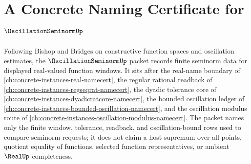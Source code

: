 \chapter{A Concrete Naming Certificate for $\OscillationSeminormUp$}
\label{ch:concrete-instances-oscillation-seminorm-namecert}

Following Bishop and Bridges on constructive function spaces and oscillation estimates, the $\OscillationSeminormUp$ packet records finite seminorm data for displayed real-valued function windows. It sits after the real-name boundary of \autoref{ch:concrete-instances-real-namecert}, the regular rational readback of \autoref{ch:concrete-instances-regseqrat-namecert}, the dyadic tolerance core of \autoref{ch:concrete-instances-dyadicratcore-namecert}, the bounded oscillation ledger of \autoref{ch:concrete-instances-bounded-oscillation-namecert}, and the oscillation modulus route of \autoref{ch:concrete-instances-oscillation-modulus-namecert}. The packet names only the finite window, tolerance, readback, and oscillation-bound rows used to compare seminorm requests; it does not claim a host supremum over all points, quotient equality of functions, selected function representatives, or ambient $\RealUp$ completeness.

